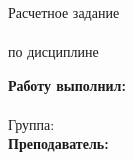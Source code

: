 \begin{titlepage}	%

	\begin{center}		%

		\large \university \\
		\large \faculty \\
		\large \department \\[6cm]

		\huge {Расчетное задание} \\[0.5cm] %
		\large \textbf \docname \\[0.5cm]
		\large {по дисциплине}  \\[0.5cm] %
		\large \subject  \\[5.1cm]

	\end{center}


	\begin{flushright} %
		\begin{minipage}{0.3\textwidth} %
			\begin{flushleft} %

				\large\textbf{Работу выполнил:}\\
				\large \studentname \\
				\large {Группа:} \group \\

				\large \textbf{Преподаватель:}\\
				\large \tutorname

			\end{flushleft}
		\end{minipage}
	\end{flushright}

	\vfill %

	\begin{center}
		\large \city \\
		\large \the\year %
	\end{center} %

\end{titlepage} %


